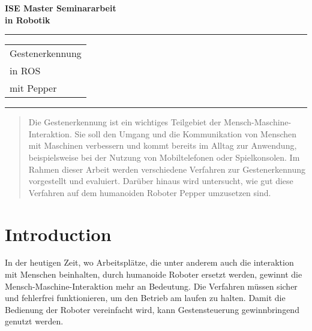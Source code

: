 \documentclass{llncs}
\begin{document}
\thispagestyle{empty}
\begin{flushleft}
\LARGE\bfseries ISE Master Seminararbeit\\
in Robotik\\[2cm]
\end{flushleft}
\rule{\textwidth}{1pt}
\vspace{2pt}
\begin{flushright}
\Huge
\begin{tabular}{@{}l}
Gestenerkennung\\
in ROS\\
mit Pepper\\[6pt]
\end{tabular}
\end{flushright}
\rule{\textwidth}{1pt}
\vfill
%
\newpage
\tableofcontents
\newpage
%

\begin{abstract}
Die Gestenerkennung ist ein wichtiges Teilgebiet der Mensch-Maschine-Interaktion. Sie soll den Umgang und die Kommunikation von Menschen mit Maschinen verbessern und kommt bereits im Alltag zur Anwendung, beispielsweise bei der Nutzung von Mobiltelefonen oder Spielkonsolen. Im Rahmen dieser Arbeit werden verschiedene Verfahren zur Gestenerkennung vorgestellt und evaluiert. Darüber hinaus wird untersucht, wie gut diese Verfahren auf dem humanoiden Roboter \glqq Pepper\grqq\hspace{1pt} umzusetzen sind.




\end{abstract}
%
\section{Introduction}
In der heutigen Zeit, wo Arbeitspl\"atze, die unter anderem auch die interaktion mit Menschen beinhalten, durch humanoide Roboter ersetzt werden, gewinnt die Mensch-Maschine-Interaktion mehr an Bedeutung. Die Verfahren m\"ussen sicher und fehlerfrei funktionieren, um den Betrieb am laufen zu halten. Damit die Bedienung der Roboter vereinfacht wird, kann Gestensteuerung gewinnbringend genutzt werden.
%
\end{document}

